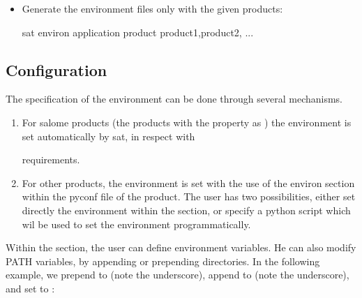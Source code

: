 \documentclass[a4paper,10pt,english]{sphinxmanual}
\begin{document}
\begin{itemize}
\item {} 
Generate the environment files only with the given products:

%
\begin{sphinxVerbatim}[commandchars=\\\{\}]
sat environ \PYGZlt{}application\PYGZgt{} \PYGZhy{}\PYGZhy{}product \PYGZlt{}product1\PYGZgt{},\PYGZlt{}product2\PYGZgt{}, ...
\end{sphinxVerbatim}

\end{itemize}


\subsection{Configuration}
\label{\detokenize{commands/environ:configuration}}
The specification of the environment can be done through several mechanisms.
\begin{enumerate}
\item {} 
For salome products (the products with the property  as ) the environment is set automatically by sat, in respect with %
\begin{footnote}[12]\sphinxAtStartFootnote
{}
%
\end{footnote} requirements.

\item {} 
For other products, the environment is set with the use of the environ section within the pyconf file of the product. The user has two possibilities, either set directly the environment within the section, or specify a python script which wil be used to set the environment programmatically.

\end{enumerate}

Within the section, the user can define environment variables. He can also modify PATH variables, by appending or prepending directories.
In the following example, we prepend  to  (note the  underscore), append  to  (note the  underscore), and set  to :
\end{document}
